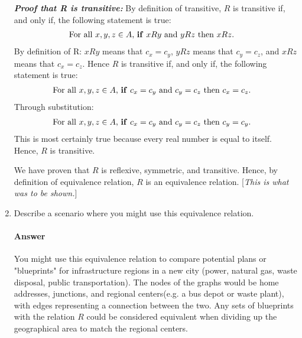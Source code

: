 \documentclass{article}
\begin{document}
\begin{enumerate}
        \emph{\textbf{Proof that R is transitive:}} By definition of transitive, $R$ is transitive if, and only if, the following statement is true:
        \begin{align} &\nonumber \text{For all $x,y,z \in A$, \textbf{if} $xRy$ and $yRz$ then $xRz$.}
        \end{align}
        By definition of R: $xRy$ means that $c_{x} = c_{y}$, $yRz$ means that $c_{y} = c_{z}$, and $xRz$ means that $c_{x} = c_{z}$. Hence $R$ is transitive if, and only if, the following statement is true:
        \begin{align} &\nonumber \text{For all $x,y,z \in A$, \textbf{if} $c_{x} = c_{y}$ and $c_{y} = c_{z}$ then $c_{x} = c_{z}$.}
        \end{align}
        Through substitution:
        \begin{align} &\nonumber \text{For all $x,y,z \in A$, \textbf{if} $c_{x} = c_{y}$ and $c_{y} = c_{z}$ then $c_{y} = c_{y}$.}
        \end{align}
        This is most certainly true because every real number is equal to itself. Hence, $R$ is transitive.

        We have proven that $R$ is reflexive, symmetric, and transitive. Hence, by definition of equivalence relation, $R$ is an equivalence relation. [\emph{This is what was to be shown.}]
\pagebreak
    \item Describe a scenario where you might use this equivalence relation.

        \paragraph{Answer}

        You might use this equivalence relation to compare potential plans or "blueprints" for infrastructure regions in a new city (power, natural gas, waste disposal, public transportation). The nodes of the graphs would be home addresses, junctions, and regional centers(e.g. a bus depot or waste plant), with edges representing a connection between the two. Any sets of blueprints with the relation $R$ could be considered equivalent when dividing up the geographical area to match the regional centers.

\end{enumerate}

\collab{} 
\end{document}
